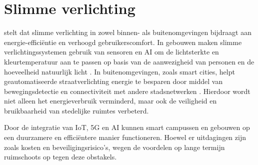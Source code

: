 \section{Slimme verlichting}

\textcite{Poyyamozhi2024} stelt dat slimme verlichting in zowel binnen- als buitenomgevingen bijdraagt aan energie-efficiëntie en verhoogd gebruikerscomfort. In gebouwen maken slimme verlichtingssystemen gebruik van sensoren en AI om de lichtsterkte en kleurtemperatuur aan te passen op basis van de aanwezigheid van personen en de hoeveelheid natuurlijk licht \autocite{Wang2024}. In buitenomgevingen, zoals smart cities, helpt geautomatiseerde straatverlichting energie te besparen door middel van bewegingsdetectie en connectiviteit met andere stadsnetwerken \autocite{Huseien_2022}. Hierdoor wordt niet alleen het energieverbruik verminderd, maar ook de veiligheid en bruikbaarheid van stedelijke ruimtes verbeterd.

Door de integratie van IoT, 5G en AI kunnen smart campussen en gebouwen op een duurzamere en efficiëntere manier functioneren. Hoewel er uitdagingen zijn zoals kosten en beveiligingsrisico’s, wegen de voordelen op lange termijn ruimschoots op tegen deze obstakels.






